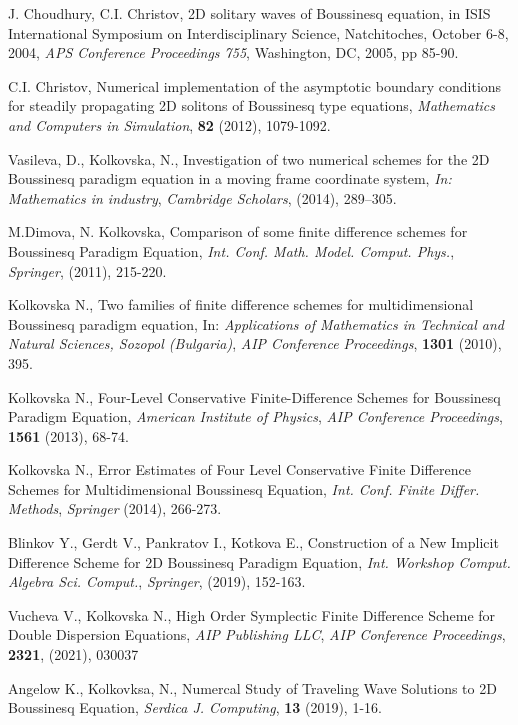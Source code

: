 \documentclass[a4paper]{article}
\theoremstyle{remark}
\begin{document}
\begin{large}
\begin{thebibliography}{99}
	 J. Choudhury, C.I. Christov,
2D solitary waves of Boussinesq equation, in ISIS International Symposium on Interdisciplinary Science, Natchitoches, October 6-8, 2004, {\it APS Conference Proceedings 755}, Washington, DC, 2005, pp 85-90.

	 C.I. Christov,
Numerical implementation of the asymptotic boundary conditions for steadily propagating 2D solitons of Boussinesq type equations,
{\it Mathematics and Computers in Simulation}, \textbf{82} (2012), 1079-1092.

	 Vasileva, D., Kolkovska, N., Investigation of two numerical schemes for the 2D Boussinesq paradigm equation in a moving frame coordinate system, {\it In: Mathematics in industry},
\emph{Cambridge Scholars}, (2014), 289–305.

	 M.Dimova, N. Kolkovska, Comparison of some finite difference schemes for Boussinesq Paradigm Equation, 
{\it Int. Conf. Math. Model. Comput. Phys.}, \emph{Springer}, (2011), 215-220.

	 Kolkovska N., Two families of finite difference schemes for multidimensional Boussinesq paradigm equation, In:
{\it Applications of Mathematics in Technical and Natural Sciences,  Sozopol (Bulgaria)},
\emph{AIP Conference Proceedings}, \textbf{1301} (2010), 395.

	 Kolkovska N., Four-Level Conservative Finite-Difference Schemes for Boussinesq Paradigm Equation, {\it American Institute of Physics},
\emph{AIP Conference Proceedings}, \textbf{1561} (2013), 68-74.

	 Kolkovska N., Error Estimates of Four Level Conservative Finite Difference Schemes for Multidimensional Boussinesq  Equation,  {\it Int. Conf. Finite Differ. Methods}, \emph{Springer} (2014), 266-273.

	 Blinkov Y., Gerdt V., Pankratov I., Kotkova E., Construction of a New Implicit Difference Scheme for 2D Boussinesq Paradigm Equation, {\it Int. Workshop Comput. Algebra Sci. Comput.}, \emph{Springer}, (2019), 152-163.

	 Vucheva V., Kolkovska N., High Order Symplectic Finite Difference Scheme for Double Dispersion Equations, {\it AIP Publishing LLC}, \emph{AIP Conference Proceedings}, \textbf{2321}, (2021), 030037

	 Angelow K., Kolkovksa, N., Numercal Study of Traveling Wave Solutions to 2D Boussinesq Equation, {\it Serdica J. Computing}, \textbf{13} (2019), 1-16.


\end{thebibliography}
\end{large}
\end{document}
